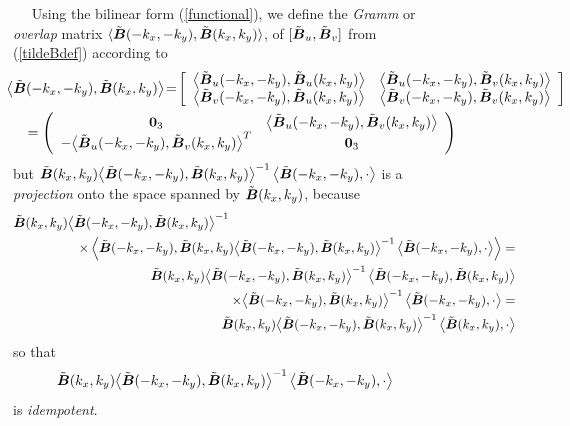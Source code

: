 \begin{figure}
{\begin{minipage} {142.0mm}
$\quad$ Using the bilinear form (\ref{functional}), we define the {\em Gramm\/} or 
{\em overlap\/} matrix 
$\langle \tilde{\mbox{\boldmath$\mit B$\unboldmath}}(-k_x,-k_y), \tilde{\mbox{\boldmath$\mit B$\unboldmath}}(k_x,k_y) \rangle$, 
of  $[\tilde{\mbox{\boldmath$\mit B$\unboldmath}}_{u},\tilde{\mbox{\boldmath$\mit B$\unboldmath}}_{v}]$ from 
(\ref{tildeBdef}) according to
\begin{eqnarray*}
\lefteqn{\!\!\!
\left\langle{ \tilde{\bmi  B}(-k_x,-k_y),\tilde{\bmi  B}(k_x,k_y)}\right\rangle 
\!=\!\left[{\begin{array}{cc}\left\langle{\tilde{\bmi  B}_{u}(-k_x,-k_y),\tilde{\bmi 
B}_{u}(k_x,k_y)}\right\rangle&
\left\langle{\tilde{\bmi  B}_{u}(-k_x,-k_y),\tilde{\bmi  B}_{v}(k_x,k_y)}\right\rangle\\ 
\left\langle{\tilde{\bmi  B}_{v}(-k_x,-k_y),\tilde{\bmi  B}_{u}(k_x,k_y)}\right\rangle&
\left\langle{\tilde{\bmi 
B}_{v}(-k_x,-k_y),\tilde{\bmi  B}_{v}(k_x,k_y)}
\right\rangle\end{array}}\right]}\\
&&=\left({\begin{array}{cc}{\bf 
0}_{3}&\left\langle{
\tilde{\bmi  B}_{u}(-k_x,-k_y),\tilde{\bmi  B}_{v}(k_x,k_y)}\right\rangle\\ 
-{\left\langle{\tilde{\bmi  B}_{u}(-k_x,-k_y),\tilde{\bmi  B}_{v}(k_x,k_y)}\right\rangle}^{T}&{\bf 
0}_{3}\end{array}}\right)
\end{eqnarray*} 
but $\tilde{\mbox{\boldmath$\mit B$\unboldmath}}(k_x,k_y){\left\langle{\tilde{\mbox{\boldmath$\mit B$\unboldmath}}(-k_x,-k_y),\tilde{\mbox{\boldmath$\mit B$\unboldmath}}(k_x,k_y)}\right\rangle}^{-1}\left\langle{\tilde{\mbox{\boldmath$\mit B$\unboldmath}}(-k_x,-k_y),\cdot 
}\right\rangle$ is a  {\em projection\/} onto the space spanned by  $\tilde{\mbox{\boldmath$\mit B$\unboldmath}}(k_x,k_y)$, because 
\begin{eqnarray*}
\lefteqn{
\tilde{\bmi  B}(k_x,k_y){\left\langle{\tilde{\bmi  B}(-k_x,-k_y),\tilde{\bmi  B}(k_x,k_y)}
\right\rangle}^{-1}}\\
&&\qquad \qquad \times \left\langle{\tilde{\bmi 
B}(-k_x,-k_y),\tilde{\bmi  B}(k_x,k_y){\left\langle{\tilde{\bmi  B}(-k_x,-k_y),
\tilde{\bmi  B}(k_x,k_y)}\right\rangle}^{-1}
\left\langle{\tilde{\bmi  B}(-k_x,-k_y),\cdot 
}\right\rangle}\right\rangle=\\
&&\!\!\!\!\!\!
\tilde{\bmi  B}(k_x,k_y){\left\langle{\tilde{\bmi  B}(-k_x,-k_y),\tilde{\bmi 
B}(k_x,k_y)}\right\rangle}^{-1}\left\langle{\tilde{\bmi  B}(-k_x,-k_y),
\tilde{\bmi  B}(k_x,k_y)}\right
\rangle\\
&&\qquad \qquad \times {\left\langle{\tilde{\bmi  B}(-k_x,-k_y),\tilde{\bmi  B}(k_x,k_y)}\right\rangle}^{-1}
\left\langle{\tilde{\bmi 
B}(-k_x,-k_y),\cdot 
}\right\rangle=\\
&&\!\!\!\!\!\!
\tilde{\bmi  B}(k_x,k_y){\left\langle{\tilde{\bmi  B}(-k_x,-k_y),\tilde{\bmi 
B}(k_x,k_y)}\right\rangle}^{-1}\left\langle{\tilde{\bmi  B}(k_x,k_y),\cdot 
}\right\rangle
\end{eqnarray*} 
so that 
\[
\tilde{\mbox{\boldmath$\mit B$\unboldmath}}(k_x,k_y){\left\langle{\tilde{\mbox{\boldmath$\mit B$\unboldmath}}(-k_x,-k_y),\tilde{\mbox{\boldmath$\mit B$\unboldmath}}(k_x,k_y)}\right\rangle}^{-1}\left\langle{\tilde{\mbox{\boldmath$\mit B$\unboldmath}}(-k_x,-k_y),\cdot }
\right\rangle 
\] 
is {\em idempotent\/}.


\end{minipage}}
\end{figure}
